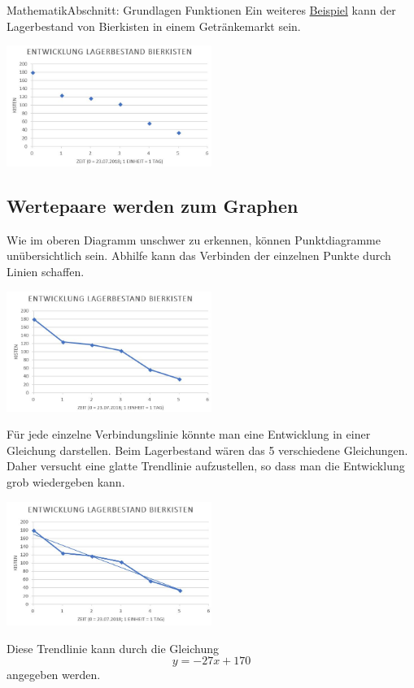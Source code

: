 \documentclass[11pt,twocolumn,oneside,openany,headings=optiontotoc,11pt,numbers=noenddot]{article}
\begin{document}
\begin{worksheet}{}{Mathematik}{Abschnitt: Grundlagen Funktionen}
		Ein weiteres \underline{Beispiel} kann der Lagerbestand von Bierkisten in einem Getränkemarkt sein.\\
		\par\bigskip\noindent
		\includegraphics[width=0.5\textwidth]{../99_Bilder/bier.jpg}
		\subsection{Wertepaare werden zum Graphen}
		Wie im oberen Diagramm unschwer zu erkennen, können Punktdiagramme unübersichtlich sein. Abhilfe kann das Verbinden der einzelnen Punkte durch Linien schaffen.\\
		\par\bigskip\noindent
		\includegraphics[width=0.5\textwidth]{../99_Bilder/bier1.jpg}\\
		\par\bigskip\noindent
		Für jede einzelne Verbindungslinie könnte man eine Entwicklung in einer Gleichung darstellen. Beim Lagerbestand wären das 5 verschiedene Gleichungen.\\
		Daher versucht eine glatte Trendlinie aufzustellen, so dass man die Entwicklung grob wiedergeben kann.\\
		\par\bigskip\noindent
		\includegraphics[width=0.5\textwidth]{../99_Bilder/bier2.jpg}\\
		\par\bigskip\noindent
		Diese Trendlinie kann durch die Gleichung
		\[y = -27x + 170\]
		angegeben werden.

\end{worksheet}
\end{document}
